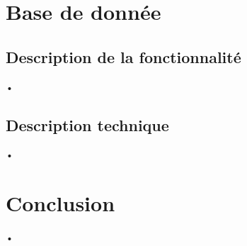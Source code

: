 \documentclass[10pt,a4paper]{report}
\begin{document}

\section{Base de donnée}

\subsection{Description de la fonctionnalité}
\begin{flushleft}
•
\end{flushleft}

\subsection{Description technique}
\begin{flushleft}
•
\end{flushleft}



\section{Conclusion}
\begin{flushleft}
•
\end{flushleft}
\end{document}

